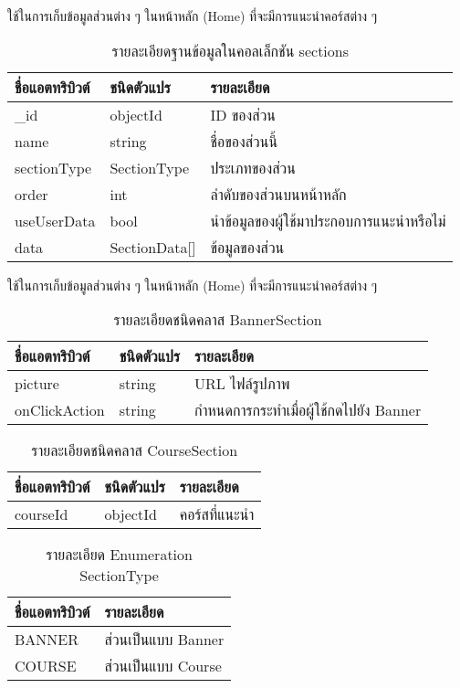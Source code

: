 \begin{table}
    \caption{รายละเอียดฐานข้อมูลในคอลเล็กชัน sections}
    \noindent ใช้ในการเก็บข้อมูลส่วนต่าง ๆ ในหน้าหลัก (Home) ที่จะมีการแนะนำคอร์สต่าง ๆ
    \begin{tabularx}{\textwidth}{ | l | l | X | }
        \hline
        \bf ชื่อแอตทริบิวต์ & \bf ชนิดตัวแปร & \bf รายละเอียด \\\hline
        \_id & objectId & ID ของส่วน\\\hline
        name & string & ชื่อของส่วนนี้\\\hline
        sectionType & SectionType & ประเภทของส่วน\\\hline
        order & int & ลำดับของส่วนบนหน้าหลัก\\\hline
        useUserData & bool & นำข้อมูลของผู้ใช้มาประกอบการแนะนำหรือไม่\\\hline
        data & SectionData[] & ข้อมูลของส่วน\\\hline
    \end{tabularx}
\end{table}

\begin{table}
    \caption{รายละเอียดชนิดคลาส BannerSection}
    \noindent ใช้ในการเก็บข้อมูลส่วนต่าง ๆ ในหน้าหลัก (Home) ที่จะมีการแนะนำคอร์สต่าง ๆ
    \begin{tabularx}{\textwidth}{ | l | l | X | }
        \hline
        \bf ชื่อแอตทริบิวต์ & \bf ชนิดตัวแปร & \bf รายละเอียด \\\hline
        picture & string & URL ไฟล์รูปภาพ\\\hline
        onClickAction & string & กำหนดการกระทำเมื่อผู้ใช้กดไปยัง Banner\\\hline
    \end{tabularx}
\end{table}

\begin{table}
    \caption{รายละเอียดชนิดคลาส CourseSection}
    \begin{tabularx}{\textwidth}{ | l | l | X | }
        \hline
        \bf ชื่อแอตทริบิวต์ & \bf ชนิดตัวแปร & \bf รายละเอียด \\\hline
        courseId & objectId & คอร์สที่แนะนำ\\\hline
    \end{tabularx}
\end{table}

\begin{table}
    \caption{รายละเอียด Enumeration SectionType}
    \begin{tabularx}{\textwidth}{ | l | X | }
        \hline
        \bf ชื่อแอตทริบิวต์ & \bf รายละเอียด \\\hline
        BANNER & ส่วนเป็นแบบ Banner\\\hline
        COURSE & ส่วนเป็นแบบ Course\\\hline
    \end{tabularx}
\end{table}

